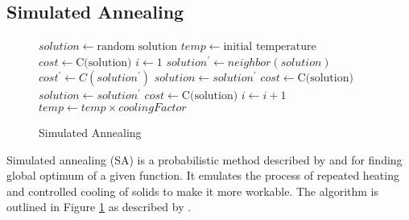 \subsection{Simulated Annealing}
\begin{center}
\begin{figure}[h]
    \begin{algorithmic}
        \State $solution \gets \text{random solution}$
        \State $temp \gets \text{initial temperature}$
        \State $cost \gets \text{C(solution)}$
            \State $i \gets 1$
                \State $solution^{\prime} \gets neighbor(solution)$
                \State $cost^{\prime} \gets C(solution^{\prime})$
                    \State $solution \gets solution^{\prime}$
                    \State $cost \gets \text{C(solution)}$
                \Else
                        \State $solution \gets solution^{\prime}$
                        \State $cost \gets \text{C(solution)}$
                    \EndIf
                \EndIf
                \State $i \gets i+1$
            \EndWhile
            \State $temp \gets temp \times coolingFactor$
        \EndWhile
    \end{algorithmic}
    \caption{Simulated Annealing}
    \label{al_simulated_annealing}
\end{figure}
\end{center}

Simulated annealing (SA) is a probabilistic method described by \cite{Kirkpatrick1983} and \cite{Cerny1985} for finding global optimum of a given function. It emulates the process of repeated heating and controlled cooling of solids to make it more workable. The algorithm is outlined in Figure \ref{al_simulated_annealing} as described by \cite{Cerny1985}.